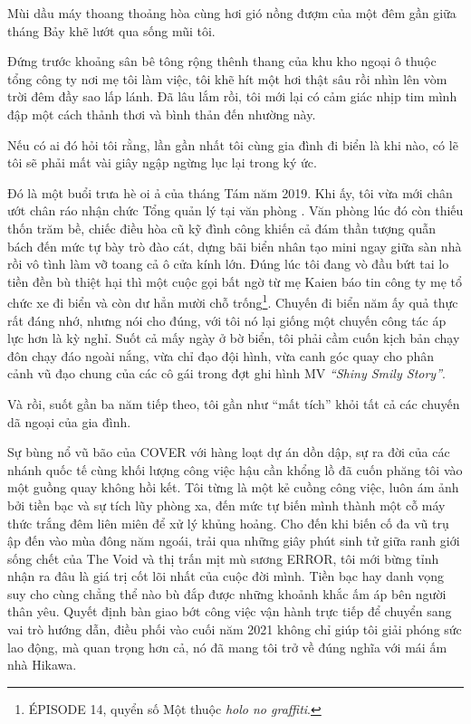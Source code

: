 \documentclass[../main.tex]{subfiles}
\begin{document}


Mùi dầu máy thoang thoảng hòa cùng hơi gió nồng đượm của một đêm gần giữa tháng Bảy khẽ lướt qua sống mũi tôi.

Đứng trước khoảng sân bê tông rộng thênh thang của khu kho ngoại ô thuộc tổng công ty nơi mẹ tôi làm việc, tôi khẽ hít một hơi thật sâu rồi nhìn lên vòm trời đêm đầy sao lấp lánh. Đã lâu lắm rồi, tôi mới lại có cảm giác nhịp tim mình đập một cách thảnh thơi và bình thản đến nhường này.

Nếu có ai đó hỏi tôi rằng, lần gần nhất tôi cùng gia đình đi biển là khi nào, có lẽ tôi sẽ phải mất vài giây ngập ngừng lục lại trong ký ức.

Đó là một buổi trưa hè oi ả của tháng Tám năm 2019. Khi ấy, tôi vừa mới chân ướt chân ráo nhận chức Tổng quản lý tại văn phòng \hll. Văn phòng lúc đó còn thiếu thốn trăm bề, chiếc điều hòa cũ kỹ đình công khiến cả đám thần tượng quẫn bách đến mức tự bày trò đào cát, dựng bãi biển nhân tạo mini ngay giữa sàn nhà rồi vô tình làm vỡ toang cả ô cửa kính lớn. Đúng lúc tôi đang vò đầu bứt tai lo tiền đền bù thiệt hại thì một cuộc gọi bất ngờ từ mẹ Kaien báo tin công ty mẹ tổ chức xe đi biển và còn dư hẳn mười chỗ trống\footnote{{\flaregothic ÉPISODE 14}, quyển số Một thuộc \textit{holo no graffiti}.}. Chuyến đi biển năm ấy quả thực rất đáng nhớ, nhưng nói cho đúng, với tôi nó lại giống một chuyến công tác áp lực hơn là kỳ nghỉ. Suốt cả mấy ngày ở bờ biển, tôi phải cầm cuốn kịch bản chạy đôn chạy đáo ngoài nắng, vừa chỉ đạo đội hình, vừa canh góc quay cho phân cảnh vũ đạo chung của các cô gái trong đợt ghi hình MV \emph{``Shiny Smily Story''}.

Và rồi, suốt gần ba năm tiếp theo, tôi gần như ``mất tích'' khỏi tất cả các chuyến dã ngoại của gia đình.

Sự bùng nổ vũ bão của COVER với hàng loạt dự án dồn dập, sự ra đời của các nhánh quốc tế cùng khối lượng công việc hậu cần khổng lồ đã cuốn phăng tôi vào một guồng quay không hồi kết. Tôi từng là một kẻ cuồng công việc, luôn ám ảnh bởi tiền bạc và sự tích lũy phòng xa, đến mức tự biến mình thành một cỗ máy thức trắng đêm liên miên để xử lý khủng hoảng. Cho đến khi biến cố đa vũ trụ ập đến vào mùa đông năm ngoái, trải qua những giây phút sinh tử giữa ranh giới sống chết của The Void và thị trấn mịt mù sương ERROR, tôi mới bừng tỉnh nhận ra đâu là giá trị cốt lõi nhất của cuộc đời mình. Tiền bạc hay danh vọng suy cho cùng chẳng thể nào bù đắp được những khoảnh khắc ấm áp bên người thân yêu. Quyết định bàn giao bớt công việc vận hành trực tiếp để chuyển sang vai trò hướng dẫn, điều phối vào cuối năm 2021 không chỉ giúp tôi giải phóng sức lao động, mà quan trọng hơn cả, nó đã mang tôi trở về đúng nghĩa với mái ấm nhà Hikawa.
\end{document}
